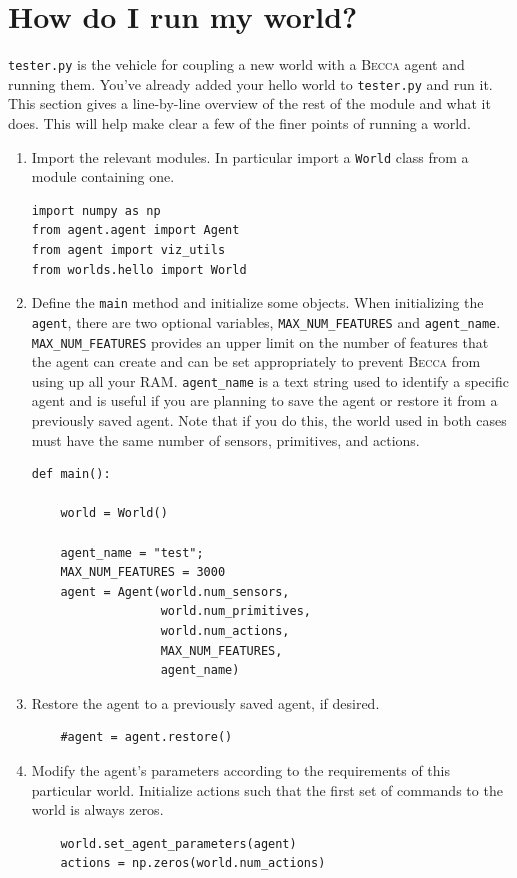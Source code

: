 \section{How do I run my world?}
\texttt{tester.py} is the vehicle for coupling a new world with a \textsc{Becca} agent and running them. You've already added your hello world to \texttt{tester.py} and run it. This section gives a line-by-line overview of the rest of the module and what it does. This will help make clear a few of the finer points of running a world.

\begin{enumerate}
\item
Import the relevant modules. In particular import a \texttt{World} class from a module containing one.
\begin{verbatim}
import numpy as np
from agent.agent import Agent
from agent import viz_utils
from worlds.hello import World
\end{verbatim}

\item
Define the \texttt{main} method and initialize some objects. When initializing the \texttt{agent}, there are two optional variables, \texttt{MAX\_NUM\_FEATURES} and \texttt{agent\_name}.  \texttt{MAX\_NUM\_FEATURES} provides an upper limit on the number of features that the agent can create and can be set appropriately to prevent \textsc{Becca} from using up all your RAM. \texttt{agent\_name} is a text string used to identify a specific agent and is useful if you are planning to save the agent or restore it from a previously saved agent. Note that if you do this, the world used in both cases must have the same number of sensors, primitives, and actions.
\begin{verbatim}
def main():
    
    world = World()
    
    agent_name = "test";
    MAX_NUM_FEATURES = 3000
    agent = Agent(world.num_sensors, 
                  world.num_primitives, 
                  world.num_actions, 
                  MAX_NUM_FEATURES, 
                  agent_name)

\end{verbatim}

\item
Restore the agent to a previously saved agent, if desired.
\begin{verbatim}
    #agent = agent.restore()
\end{verbatim}
    
\item
Modify the agent's parameters according to the requirements of this particular world. Initialize actions such that the first set of commands to the world is always zeros.
\begin{verbatim}
    world.set_agent_parameters(agent)
    actions = np.zeros(world.num_actions)
\end{verbatim}


\end{enumerate}
